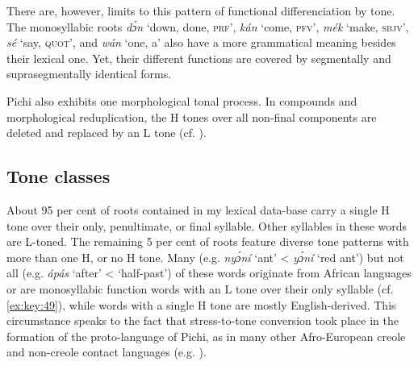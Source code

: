 
There are, however, limits to this pattern of functional differenciation by tone. The monosyllabic roots \textit{dɔ́n} ‘down, done, \textsc{prf’}, \textit{kán} ‘come, \textsc{pfv’,} \textit{mék} ‘make, \textsc{sbjv}’, \textit{sé} ‘say, \textsc{quot’,} and \textit{wán} ‘one, a’ also have a more grammatical meaning besides their lexical one. Yet, their different functions are covered by segmentally and suprasegmentally identical forms. 


Pichi also exhibits one morphological tonal process. In compounds and morphological reduplication, the H tones over all non-final components are deleted and replaced by an L tone (cf. ).


\subsection{Tone classes}\label{sec:3.1.3}

About 95 per cent of roots contained in my lexical data-base carry a single H tone over their only, penultimate, or final syllable. Other syllables in these words are L-toned. The remaining 5 per cent of roots feature diverse tone patterns with more than one H, or no H tone. Many (e.g. \textit{nyɔ́ní} ‘ant’ <  \textit{yɔ́ní} ‘red ant’) but not all (e.g. \textit{ápás} ‘after’ <  ‘half-past’) of these words originate from African languages or are monosyllabic function words with an L tone over their only syllable (cf. \ref{ex:key:49}), while words with a single H tone are mostly English-derived. This circumstance speaks to the fact that stress-to-tone conversion took place in the formation of the proto-language of Pichi, as in many other Afro-European creole and non-creole contact languages (e.g. \citealt{Berry1970,Criper1971,Criper-Friedman1990,Alleyne1980,GussenhovenUdofot2010,Steien2015}). 

